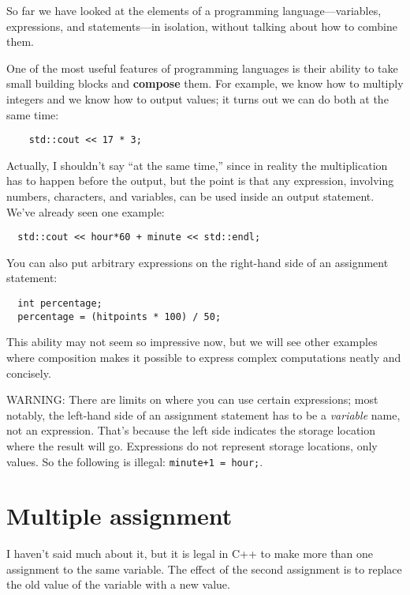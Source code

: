 So far we have looked at the elements of a programming
language---variables, expressions, and statements---in
isolation, without talking about how to combine them.

One of the most useful features of programming languages
is their ability to take small building blocks and
{\bf compose} them.  For example, we know how to multiply
integers and we know how to output values; it turns out we can
do both at the same time:

\begin{verbatim}
    std::cout << 17 * 3;
\end{verbatim}
%
Actually, I shouldn't say ``at the same time,'' since in reality
the multiplication has to happen before the output, but
the point is that any expression, involving numbers, characters,
and variables, can be used inside an output statement.  We've
already seen one example:

\begin{verbatim}
  std::cout << hour*60 + minute << std::endl;
\end{verbatim}
%
You can also put arbitrary expressions on the right-hand
side of an assignment statement:

\begin{lstlisting}
  int percentage;
  percentage = (hitpoints * 100) / 50;
\end{lstlisting}
%
This ability may not seem so impressive now, but we will see
other examples where composition makes it possible
to express complex computations neatly and concisely.

WARNING: There are limits on where you can use certain
expressions; most notably, the left-hand side of an assignment
statement has to be a {\em variable} name, not an expression.
That's because the left side indicates the storage location
where the result will go.  Expressions
do not represent storage locations, only values.  So the
following is illegal:  {\tt minute+1 = hour;}.

\section{Multiple assignment}

I haven't said much about it, but it is legal in C++ to
make more than one assignment to the same variable.  The
effect of the second assignment is to replace the old value
of the variable with a new value.

